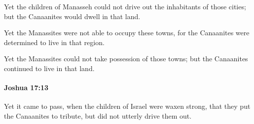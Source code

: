 			\begin{versebox}
					\item[BHS] 
					\item[ASV] Yet the children of Manasseh could not drive out the inhabitants of those cities; but the Canaanites would dwell in that land.
					\item[NIV] Yet the Manassites were not able to occupy these towns, for the Canaanites were determined to live in that region.
					\item[NRSV] Yet the Manassites could not take possession of those towns; but the Canaanites continued to live in that land.
			\end{versebox}

		\paragraph{Joshua 17:13} %
			\label{JOSHUA-17-13}

			Yet it came to pass, when the children of Israel were waxen strong, that they put the Canaanites to tribute, but did not utterly drive them out.

